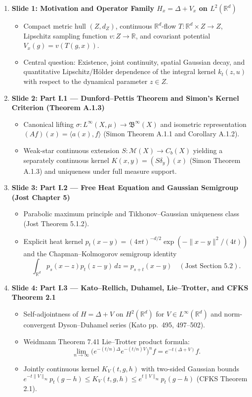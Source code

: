 \begin{enumerate}
  \item \textbf{Slide 1: Motivation and Operator Family $H_x = \Delta + V_x$ on $L^2(\mathbb{R}^d)$}
  \begin{itemize}
    \item Compact metric hull $(Z, d_Z)$, continuous $\mathbb{R}^d$-flow $T : \mathbb{R}^d \times Z \to Z$, Lipschitz sampling function $v : Z \to \mathbb{R}$, and covariant potential $V_x(g) = v(T(g, x))$.
    \item Central question: Existence, joint continuity, spatial Gaussian decay, and quantitative Lipschitz/H\"older dependence of the integral kernel $k_t(z, u)$ with respect to the dynamical parameter $z \in Z$.
  \end{itemize}

  \item \textbf{Slide 2: Part I.1 --- Dunford--Pettis Theorem and Simon's Kernel Criterion (Theorem A.1.3)}
  \begin{itemize}
    \item Canonical lifting $\sigma : L^\infty(X, \mu) \to \mathfrak{B}^\infty(X)$ and isometric representation $(A f)(x) = \langle a(x), f \rangle$ (Simon Theorem A.1.1 and Corollary A.1.2).
    \item Weak-star continuous extension $S : \mathcal{M}(X) \to C_b(X)$ yielding a separately continuous kernel $K(x, y) = (S\delta_y)(x)$ (Simon Theorem A.1.3) and uniqueness under full measure support.
  \end{itemize}

  \item \textbf{Slide 3: Part I.2 --- Free Heat Equation and Gaussian Semigroup (Jost Chapter 5)}
  \begin{itemize}
    \item Parabolic maximum principle and Tikhonov--Gaussian uniqueness class (Jost Theorem 5.1.2).
    \item Explicit heat kernel $p_t(x - y) = (4\pi t)^{-d/2}\exp(-\|x - y\|^2/(4t))$ and the Chapman--Kolmogorov semigroup identity
    \[
      \int_{\mathbb{R}^d} p_s(x - z)p_t(z - y)\,dz = p_{s+t}(x - y) \quad (\text{Jost Section 5.2}).
    \]
  \end{itemize}

  \item \textbf{Slide 4: Part I.3 --- Kato--Rellich, Duhamel, Lie--Trotter, and CFKS Theorem 2.1}
  \begin{itemize}
    \item Self-adjointness of $H = \Delta + V$ on $H^2(\mathbb{R}^d)$ for $V \in L^\infty(\mathbb{R}^d)$ and norm-convergent Dyson--Duhamel series (Kato pp.~495, 497--502).
    \item Weidmann Theorem 7.41 Lie--Trotter product formula:
    \[
      \lim_{n\to\infty} \bigl(e^{-(t/n)\Delta}e^{-(t/n)V}\bigr)^n f = e^{-t(\Delta+V)}f.
    \]
    \item Jointly continuous kernel $K_V(t, g, h)$ with two-sided Gaussian bounds $e^{-t\|V\|_\infty}p_t(g-h) \le K_V(t,g,h) \le e^{t\|V\|_\infty}p_t(g-h)$ (CFKS Theorem 2.1).
  \end{itemize}


\end{enumerate}
